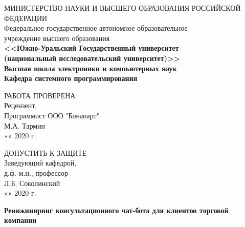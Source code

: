 \begin{titlepage}
    \begin{center}
        \footnotesize
        МИНИСТЕРСТВО НАУКИ И ВЫСШЕГО ОБРАЗОВАНИЯ РОССИЙСКОЙ ФЕДЕРАЦИИ\\
        \small
        Федеральное государственное автономное образовательное\\
        учреждение высшего образования\\
        \normalsize
        \textbf{
        <<Южно-Уральский Государственный университет\\
        (национальный исследовательский университет)>>\\
        \small
        Высшая школа электроники и компьютерных наук\\
        Кафедра системного программирования
        \normalsize
        }
        \bigskip
        
        \noindent
        \newline
        \begin{minipage}{0.5\textwidth}
            РАБОТА ПРОВЕРЕНА\\
            Рецензент,\\
            Программист ООО "Бонапарт"\\
            \underline{\hspace{2cm}} М.А. Тармин\\
            «\underline{\hspace{0.7cm}}» \underline{\hspace{2cm}} 2020 г.
        \end{minipage}
        \vspace{\fill}
        \begin{minipage}{0.4\textwidth}
            ДОПУСТИТЬ К ЗАЩИТЕ\\
            Заведующий кафедрой,\\
            д.ф.-м.н., профессор\\
            \underline{\hspace{2cm}} Л.Б. Соколинский\\
            «\underline{\hspace{0.7cm}}» \underline{\hspace{2cm}} 2020 г.
        \end{minipage}

        \vfill
        \textbf{
            \Large
            Реинжиниринг консультационного чат-бота для клиентов торговой компании
            \normalsize
        }
        \bigskip
        

\end{center}
\end{titlepage}

